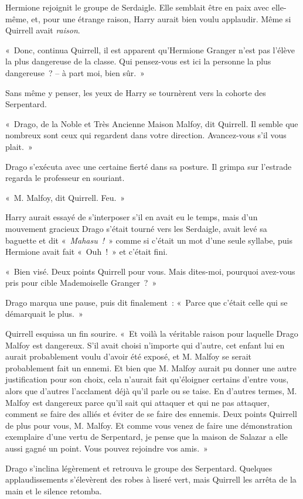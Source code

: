 Hermione rejoignit le groupe de Serdaigle.
Elle semblait être en paix avec elle-même, et, pour une étrange raison, Harry aurait bien voulu applaudir.
Même si Quirrell avait \emph{raison}.

«~Donc, continua Quirrell, il est apparent qu'Hermione Granger n'est pas l'élève la plus dangereuse de la classe.
Qui pensez-vous est ici la personne la plus dangereuse~? -- à part moi, bien sûr.~»

Sans même y penser, les yeux de Harry se tournèrent vers la cohorte des Serpentard.

«~Drago, de la Noble et Très Ancienne Maison Malfoy, dit Quirrell.
Il semble que nombreux sont ceux qui regardent dans votre direction.
Avancez-vous s'il vous plait.~»

Drago s'exécuta avec une certaine fierté dans sa posture.
Il grimpa sur l'estrade regarda le professeur en souriant.

«~M. Malfoy, dit Quirrell. Feu.~»

Harry aurait essayé de s'interposer s'il en avait eu le temps, mais d'un mouvement gracieux Drago s'était tourné vers les Serdaigle, avait levé sa baguette et dit «~\emph{Mahasu~!}~» comme si c'était un mot d'une seule syllabe, puis Hermione avait fait «~Ouh~!~» et c'était fini.

«~Bien visé. Deux points Quirrell pour vous.
Mais dites-moi, pourquoi avez-vous pris pour cible Mademoiselle Granger~?~»

Drago marqua une pause, puis dit finalement~: «~Parce que c'était celle qui se démarquait le plus.~»

Quirrell esquissa un fin sourire.
«~Et voilà la véritable raison pour laquelle Drago Malfoy est dangereux.
S'il avait choisi n'importe qui d'autre, cet enfant lui en aurait probablement voulu d'avoir été exposé, et M. Malfoy se serait probablement fait un ennemi.
Et bien que M. Malfoy aurait pu donner une autre justification pour son choix, cela n'aurait fait qu'éloigner certains d'entre vous, alors que d'autres l'acclament déjà qu'il parle ou se taise.
En d'autres termes, M. Malfoy est dangereux parce qu'il sait qui attaquer et qui ne pas attaquer, comment se faire des alliés et éviter de se faire des ennemis.
Deux points Quirrell de plus pour vous, M. Malfoy.
Et comme vous venez de faire une démonstration exemplaire d'une vertu de Serpentard, je pense que la maison de Salazar a elle aussi gagné un point.
Vous pouvez rejoindre vos amis.~»

Drago s'inclina légèrement et retrouva le groupe des Serpentard.
Quelques applaudissements s'élevèrent des robes à liseré vert, mais Quirrell les arrêta de la main et le silence retomba.

